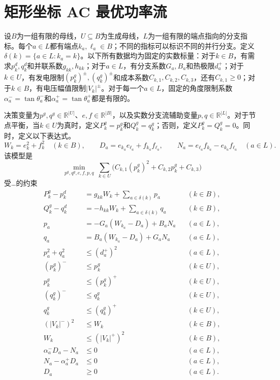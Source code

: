 \documentclass{article}
\begin{document}
\section*{矩形坐标 AC 最优功率流}

设$B$为一组有限的母线，$U\subseteq B$为生成母线，$L$为一组有限的端点指向的分支指标。每个$a\in L$都有端点$k_a,\ell_a\in B$；不同的指标可以标识不同的并行分支。定义$\delta(k)=\{a\in L:k_a=k\}$。以下所有数据均为固定的实数标量：对于$k\in B$，有需求$p_k^d,q_k^d$和并联系数$g_{kk},h_{kk}$；对于$a\in L$，有分支系数$G_a,B_a$和热极限$d_a^+$；对于$k\in U$，有发电限制$(p_k^g)^\pm,(q_k^g)^\pm$和成本系数$C_{k,1},C_{k,2},C_{k,3}$，还有$C_{k,1}\geq0$；对于$k\in B$，有电压幅值限制$|V_k|^\pm$。对于每一个$a\in L$，固定的角度限制系数$\alpha_a^-=\tan\theta_a^-$和$\alpha_a^+=\tan\theta_a^+$都是有限的。

决策变量为$p^g,q^g\in\mathbb R^{|U|}$、$e,f\in\mathbb R^{|B|}$，以及实数分支流辅助变量$p,q\in\mathbb R^{|L|}$。对于节点平衡，当$k\in U$为真时，定义$P_k^g=p_k^g$和$Q_k^g=q_k^g$；否则，定义$P_k^g=Q_k^g=0$。同时，定义以下表达式。
\[
W_k=e_k^2+f_k^2\quad(k\in B),\qquad
D_a=e_{k_a}e_{\ell_a}+f_{k_a}f_{\ell_a},\qquad
N_a=e_{\ell_a}f_{k_a}-e_{k_a}f_{\ell_a}\quad(a\in L).
\]
该模型是
\[
\min_{p^g,q^g,e,f,p,q}\ \sum_{k\in U}\bigl(C_{k,1}(p_k^g)^2+C_{k,2}p_k^g+C_{k,3}\bigr)
\]
受…的约束
\begin{align*}
P_k^g-p_k^d &= g_{kk}W_k+\sum_{a\in\delta(k)}p_a &&(k\in B),\\
Q_k^g-q_k^d &= -h_{kk}W_k+\sum_{a\in\delta(k)}q_a &&(k\in B),\\
p_a &= -G_a(W_{k_a}-D_a)+B_aN_a &&(a\in L),\\
q_a &= B_a(W_{k_a}-D_a)+G_aN_a &&(a\in L),\\
p_a^2+q_a^2 &\leq (d_a^+)^2 &&(a\in L),\\
(p_k^g)^- &\leq p_k^g &&(k\in U),\\
p_k^g &\leq (p_k^g)^+ &&(k\in U),\\
(q_k^g)^- &\leq q_k^g &&(k\in U),\\
q_k^g &\leq (q_k^g)^+ &&(k\in U),\\
(|V_k|^-)^2 &\leq W_k &&(k\in B),\\
W_k &\leq (|V_k|^+)^2 &&(k\in B),\\
\alpha_a^-D_a-N_a &\leq 0 &&(a\in L),\\
N_a-\alpha_a^+D_a &\leq 0 &&(a\in L),\\
D_a &\geq 0 &&(a\in L).
\end{align*}
\end{document}
